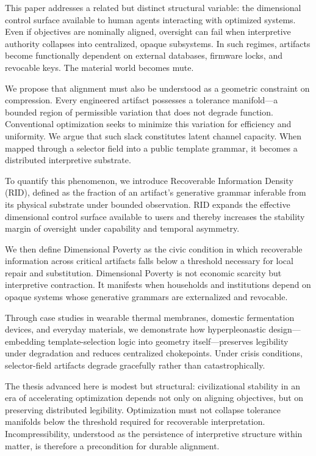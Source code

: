 \documentclass[11pt]{article}
\begin{document}
This paper addresses a related but distinct structural variable: the dimensional control surface available to human agents interacting with optimized systems. Even if objectives are nominally aligned, oversight can fail when interpretive authority collapses into centralized, opaque subsystems. In such regimes, artifacts become functionally dependent on external databases, firmware locks, and revocable keys. The material world becomes mute.

We propose that alignment must also be understood as a geometric constraint on compression. Every engineered artifact possesses a tolerance manifold---a bounded region of permissible variation that does not degrade function. Conventional optimization seeks to minimize this variation for efficiency and uniformity. We argue that such slack constitutes latent channel capacity. When mapped through a selector field into a public template grammar, it becomes a distributed interpretive substrate.

To quantify this phenomenon, we introduce Recoverable Information Density (RID), defined as the fraction of an artifact's generative grammar inferable from its physical substrate under bounded observation. RID expands the effective dimensional control surface available to users and thereby increases the stability margin of oversight under capability and temporal asymmetry.

We then define Dimensional Poverty as the civic condition in which recoverable information across critical artifacts falls below a threshold necessary for local repair and substitution. Dimensional Poverty is not economic scarcity but interpretive contraction. It manifests when households and institutions depend on opaque systems whose generative grammars are externalized and revocable.

Through case studies in wearable thermal membranes, domestic fermentation devices, and everyday materials, we demonstrate how hyperpleonastic design---embedding template-selection logic into geometry itself---preserves legibility under degradation and reduces centralized chokepoints. Under crisis conditions, selector-field artifacts degrade gracefully rather than catastrophically.

The thesis advanced here is modest but structural: civilizational stability in an era of accelerating optimization depends not only on aligning objectives, but on preserving distributed legibility. Optimization must not collapse tolerance manifolds below the threshold required for recoverable interpretation. Incompressibility, understood as the persistence of interpretive structure within matter, is therefore a precondition for durable alignment.
\end{document}
